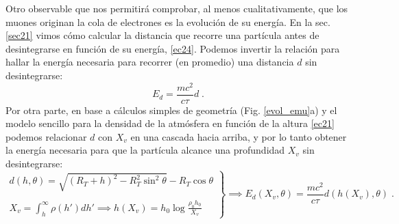 \documentclass[11 pt, a4paper]{article} %
\numberwithin{equation}{section}
\numberwithin{figure}{section}
\numberwithin{table}{section}
\begin{document}
Otro observable que nos permitirá comprobar, al menos cualitativamente, que los muones originan la cola de electrones es la evolución de su energía. En la sec. \ref{sec21} vimos cómo calcular la distancia que recorre una partícula antes de desintegrarse en función de su energía, \eqref{ec24}. Podemos invertir la relación para hallar la energía necesaria para recorrer (en promedio) una distancia $d$ sin desintegrarse:
\begin{equation}
	E_{d} = \frac{mc^2}{c\tau} d\;.\label{ec27}
\end{equation}
Por otra parte, en base a cálculos simples de geometría (Fig. \ref{evol_emu}a) y el modelo sencillo para la densidad de la atmósfera en función de la altura \eqref{ec21} podemos relacionar $d$ con $X_v$ en una cascada hacia arriba, y por lo tanto obtener la energía necesaria para que la partícula alcance una profundidad $X_v$ sin desintegrarse:
\begin{equation}
	\left.\begin{array}{r}d(h, \theta) =\sqrt{(R_T+h)^2-R_T^2\sin^2{\theta}}-R_T\cos{\theta}\\\\
	X_v=\int_h^\infty\rho(h')dh' \implies h(X_v) = h_0\log{\frac{\rho_0 h_0}{X_v}}\end{array}\right\}\implies E_d(X_v, \theta) = \frac{mc^2}{c\tau}d(h(X_v),\theta)\;.\label{ec28}
\end{equation}
\end{document}

